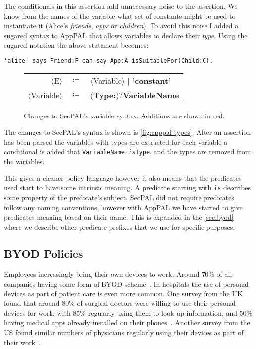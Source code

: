 \documentclass[a4paper]{scrartcl}
\newcommand{\new}[1]{{\color{BrickRed}#1}}
\begin{document}
The conditionals in this assertion add unnecessary noise to the assertion. We
know from the names of the variable what set of constants might be used
to instantiate it (Alice's \emph{friends}, \emph{apps} or \emph{children}). To
avoid this noise I added a sugared syntax to AppPAL that allows variables to
declare their \emph{type}. Using the sugared notation the above statement
becomes:

\begin{lstlisting}
'alice' says Friend:F can-say App:A isSuitableFor(Child:C).
\end{lstlisting}

\begin{figure}
  \newcommand{\nonterminal}[1]{$\langle$#1$\rangle$}
  \newcommand{\terminal}[1]{\textbf{#1}}
  \begin{tabular}{r c l}
    \footnotesize
    \nonterminal{E}         & $\coloneqq$ & \nonterminal{Variable} $\vert$ \terminal{'constant'} \\
    \nonterminal{Variable}  & $\coloneqq$ & \new{(\terminal{Type}\terminal{:})?}\terminal{VariableName}
  \end{tabular}
  \caption{Changes to SecPAL's variable syntax.  Additions are shown in \new{red}.}
  \label{fig:apppal-types}
\end{figure}
The changes to SecPAL's syntax is shown is \autoref{fig:apppal-types}.
After an assertion has been parsed the variables with types are extracted for
each variable a conditional is added that \texttt{VariableName \emph{is}Type},
and the types are removed from the variables.

This gives a cleaner policy language however it also means that the predicates
used start to have some intrinsic meaning.  A predicate starting with
\texttt{is} describes some property of the predicate's subject.
SecPAL did not require predicates follow any naming conventions, however with
AppPAL we have started to give predicates meaning based on their name.
This is expanded in the \autoref{sec:byod} where we describe other predicate
prefixes that we use for specific purposes.

\subsection{BYOD Policies}
\label{sec:byod}

Employees increasingly bring their own devices to work. Around 70\% of all
companies having some form of \ac{BYOD} scheme~\cite{schulze_byod_2016}. In
hospitals the use of personal devices as part of patient care is even more
common. One survey from the UK found that around 80\% of surgical doctors were
willing to use their personal devices for work, with 85\% regularly using them
to look up information, and 50\% having medical apps already installed on their
phones~\cite{patel_uk_2015}. Another survey from the US found similar numbers of
physicians regularly using their devices as part of their
work~\cite{moyer_managing_2013}.
\end{document}
